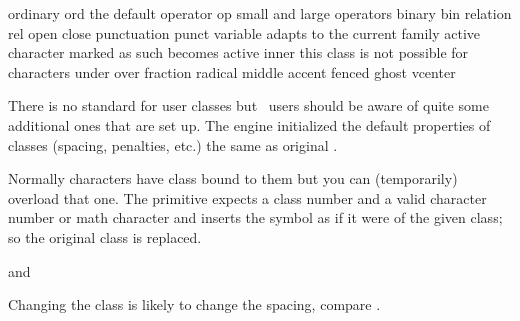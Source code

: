 \starttabulate[|l|l|T|l|]
\FL
\NC ordinary        \NC ord    \NC \the\mathordinarycode    \NC the default \NC \NR
\NC operator        \NC op     \NC \the\mathoperatorcode    \NC small and large operators \NC \NR
\NC binary          \NC bin    \NC \the\mathbinarycode      \NC \NC \NR
\NC relation        \NC rel    \NC \the\mathrelationcode    \NC \NC \NR
\NC open            \NC        \NC \the\mathopencode        \NC \NC \NR
\NC close           \NC        \NC \the\mathclosecode       \NC \NC \NR
\NC punctuation     \NC punct  \NC \the\mathpunctuationcode \NC \NC \NR
\NC variable        \NC        \NC \the\mathvariablecode    \NC adapts to the current family \NC \NR
\NC active          \NC        \NC \the\mathactivecode      \NC character marked as such becomes active \NC \NR
\NC inner           \NC        \NC \the\mathinnercode       \NC this class is not possible for characters \NC \NR
\ML
\NC under           \NC        \NC \the\mathundercode       \NC \NC \NR
\NC over            \NC        \NC \the\mathovercode        \NC \NC \NR
\NC fraction        \NC        \NC \the\mathfractioncode    \NC \NC \NR
\NC radical         \NC        \NC \the\mathradicalcode     \NC \NC \NR
\NC middle          \NC        \NC \the\mathmiddlecode      \NC \NC \NR
\NC accent          \NC        \NC \the\mathaccentcode      \NC \NC \NR
\NC fenced          \NC        \NC \the\mathfencedcode      \NC \NC \NR
\NC ghost           \NC        \NC \the\mathghostcode       \NC \NC \NR
\NC vcenter         \NC        \NC \the\mathvcentercode     \NC \NC \NR
\LL
\stoptabulate

There is no standard for user classes but \CONTEXT\ users should be aware of
quite some additional ones that are set up. The engine initialized the default
properties of classes (spacing, penalties, etc.) the same as original \TEX.

Normally characters have class bound to them but you can (temporarily) overload
that one. The  primitive expects a class number and a valid
character number or math character and inserts the symbol as if it were of the
given class; so the original class is replaced.

\startbuffer
{} and 
\stopbuffer

\typebuffer

Changing the class is likely to change the spacing, compare \inlinebuffer.

\stopnewprimitive

\startoldprimitive[title={\prm {mathclose}}]


